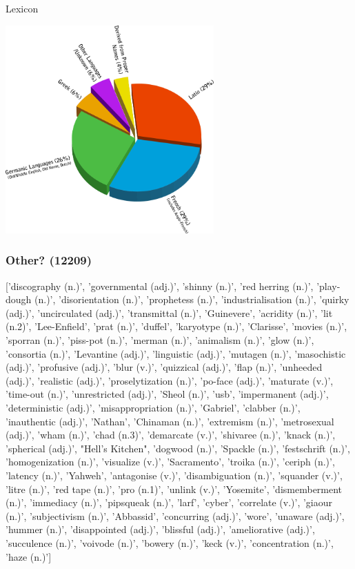 \documentclass[10pt]{beamer}
\begin{document}
\begin{frame}[fragile]{Lexicon}

  \centerline{\includegraphics[width=8cm]{badchart.png}}
  
\end{frame}

\begin{frame}[fragile]
  \frametitle{Other? (12209)}

['discography (n.)', 'governmental (adj.)', 'shinny (n.)', 'red herring (n.)', 'play-dough (n.)', 'disorientation (n.)', 'prophetess (n.)', 'industrialisation (n.)', 'quirky (adj.)', 'uncirculated (adj.)', 'transmittal (n.)', 'Guinevere', 'acridity (n.)', 'lit (n.2)', 'Lee-Enfield', 'prat (n.)', 'duffel', 'karyotype (n.)', 'Clarisse', 'movies (n.)', 'sporran (n.)', 'piss-pot (n.)', 'merman (n.)', 'animalism (n.)', 'glow (n.)', 'consortia (n.)', 'Levantine (adj.)', 'linguistic (adj.)', 'mutagen (n.)', 'masochistic (adj.)', 'profusive (adj.)', 'blur (v.)', 'quizzical (adj.)', 'flap (n.)', 'unheeded (adj.)', 'realistic (adj.)', 'proselytization (n.)', 'po-face (adj.)', 'maturate (v.)', 'time-out (n.)', 'unrestricted (adj.)', 'Sheol (n.)', 'usb', 'impermanent (adj.)', 'deterministic (adj.)', 'misappropriation (n.)', 'Gabriel', 'clabber (n.)', 'inauthentic (adj.)', 'Nathan', 'Chinaman (n.)', 'extremism (n.)', 'metrosexual (adj.)', 'wham (n.)', 'chad (n.3)', 'demarcate (v.)', 'shivaree (n.)', 'knack (n.)', 'spherical (adj.)', "Hell's Kitchen", 'dogwood (n.)', 'Spackle (n.)', 'festschrift (n.)', 'homogenization (n.)', 'visualize (v.)', 'Sacramento', 'troika (n.)', 'ceriph (n.)', 'latency (n.)', 'Yahweh', 'antagonise (v.)', 'disambiguation (n.)', 'squander (v.)', 'litre (n.)', 'red tape (n.)', 'pro (n.1)', 'unlink (v.)', 'Yosemite', 'dismemberment (n.)', 'immediacy (n.)', 'pipsqueak (n.)', 'larf', 'cyber', 'correlate (v.)', 'giaour (n.)', 'subjectivism (n.)', 'Abbassid', 'concurring (adj.)', 'wore', 'unaware (adj.)', 'hummer (n.)', 'disappointed (adj.)', 'blissful (adj.)', 'ameliorative (adj.)', 'succulence (n.)', 'voivode (n.)', 'bowery (n.)', 'keck (v.)', 'concentration (n.)', 'haze (n.)']
  
\end{frame}
\end{document}
